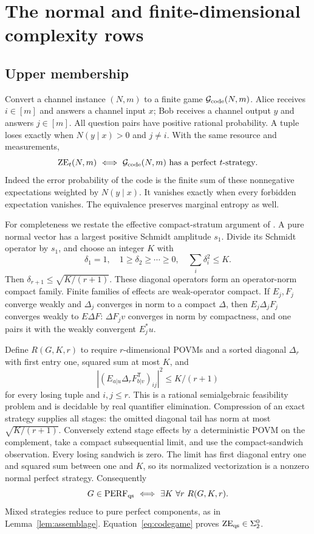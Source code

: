 \section{The normal and finite-dimensional complexity rows}\label{sec:complexity}
\subsection{Upper membership}
Convert a channel instance $(N,m)$ to a finite game $\mathcal G_{\rm code}(N,m)$. Alice receives $i\in[m]$ and answers a channel input $x$; Bob receives a channel output $y$ and answers $j\in[m]$. All question pairs have positive rational probability. A tuple loses exactly when $N(y\mid x)>0$ and $j\ne i$. With the same resource and measurements,
\begin{equation}\label{eq:codegame}
 \mathrm{ZE}_t(N,m)\ \Longleftrightarrow\
 \mathcal G_{\rm code}(N,m)\text{ has a perfect }t\text{-strategy}.
\end{equation}
Indeed the error probability of the code is the finite sum of these nonnegative expectations weighted by $N(y\mid x)$. It vanishes exactly when every forbidden expectation vanishes. The equivalence preserves marginal entropy as well.

For completeness we restate the effective compact-stratum argument of \cite[Section~3]{Sigma2}. A pure normal vector has a largest positive Schmidt amplitude $s_1$. Divide its Schmidt operator by $s_1$, and choose an integer $K$ with
\[
 \delta_1=1,\quad 1\geq \delta_2\geq\cdots\geq0,\quad
 \sum_i \delta_i^2\leq K.
\]
Then $\delta_{r+1}\leq\sqrt{K/(r+1)}$. These diagonal operators form an operator-norm compact family. Finite families of effects are weak-operator compact. If $E_j,F_j$ converge weakly and $\Delta_j$ converges in norm to a compact $\Delta$, then $E_j\Delta_jF_j$ converges weakly to $E\Delta F$: $\Delta F_jv$ converges in norm by compactness, and one pairs it with the weakly convergent $E_j^*u$.

Define $R(G,K,r)$ to require $r$-dimensional POVMs and a sorted diagonal $\Delta_r$ with first entry one, squared sum at most $K$, and
\[
 |(E_{a|u}\Delta_rF_{b|v}^{\mathsf T})_{ij}|^2\leq K/(r+1)
\]
for every losing tuple and $i,j\leq r$. This is a rational semialgebraic feasibility problem and is decidable by real quantifier elimination. Compression of an exact strategy supplies all stages: the omitted diagonal tail has norm at most $\sqrt{K/(r+1)}$. Conversely extend stage effects by a deterministic POVM on the complement, take a compact subsequential limit, and use the compact-sandwich observation. Every losing sandwich is zero. The limit has first diagonal entry one and squared sum between one and $K$, so its normalized vectorization is a nonzero normal perfect strategy. Consequently
\[
 G\in\operatorname{PERF}_{\qs}\ \Longleftrightarrow\
 \exists K\ \forall r\ R(G,K,r).
\]
Mixed strategies reduce to pure perfect components, as in Lemma~\ref{lem:assemblage}. Equation~\eqref{eq:codegame} proves $\mathrm{ZE}_{\mathrm{qs}}\in\Sigma^0_2$.

